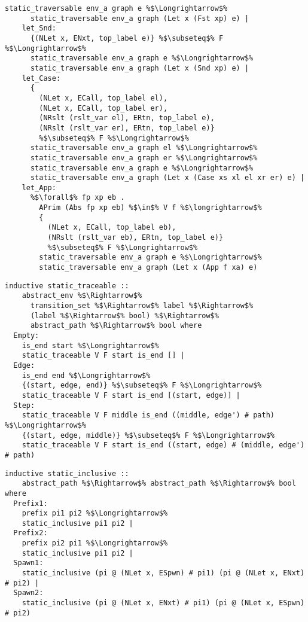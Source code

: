 \begin{lstlisting}[style=codestyle1, escapechar=\%]
      static_traversable env_a graph e %$\Longrightarrow$%
      static_traversable env_a graph (Let x (Fst xp) e) |
    let_Snd:
      {(NLet x, ENxt, top_label e)} %$\subseteq$% F %$\Longrightarrow$%
      static_traversable env_a graph e %$\Longrightarrow$%
      static_traversable env_a graph (Let x (Snd xp) e) |
    let_Case:
      {
        (NLet x, ECall, top_label el),
        (NLet x, ECall, top_label er),
        (NRslt (rslt_var el), ERtn, top_label e),
        (NRslt (rslt_var er), ERtn, top_label e)}
        %$\subseteq$% F %$\Longrightarrow$%
      static_traversable env_a graph el %$\Longrightarrow$%
      static_traversable env_a graph er %$\Longrightarrow$%
      static_traversable env_a graph e %$\Longrightarrow$%
      static_traversable env_a graph (Let x (Case xs xl el xr er) e) |
    let_App:
      %$\forall$% fp xp eb .
        APrim (Abs fp xp eb) %$\in$% V f %$\longrightarrow$%
        {
          (NLet x, ECall, top_label eb),
          (NRslt (rslt_var eb), ERtn, top_label e)}
          %$\subseteq$% F %$\Longrightarrow$%
        static_traversable env_a graph e %$\Longrightarrow$%
        static_traversable env_a graph (Let x (App f xa) e)

  \end{lstlisting}

\begin{lstlisting}[style=codestyle1, escapechar=\%]
  inductive static_traceable ::
    abstract_env %$\Rightarrow$%
      transition_set %$\Rightarrow$% label %$\Rightarrow$%
      (label %$\Rightarrow$% bool) %$\Rightarrow$%
      abstract_path %$\Rightarrow$% bool where
  Empty:
    is_end start %$\Longrightarrow$%
    static_traceable V F start is_end [] |
  Edge:
    is_end end %$\Longrightarrow$%
    {(start, edge, end)} %$\subseteq$% F %$\Longrightarrow$%
    static_traceable V F start is_end [(start, edge)] |
  Step:
    static_traceable V F middle is_end ((middle, edge') # path) %$\Longrightarrow$%
    {(start, edge, middle)} %$\subseteq$% F %$\Longrightarrow$%
    static_traceable V F start is_end ((start, edge) # (middle, edge') # path)
  \end{lstlisting}

\begin{lstlisting}[style=codestyle1, escapechar=\%]
  inductive static_inclusive ::
    abstract_path %$\Rightarrow$% abstract_path %$\Rightarrow$% bool where
  Prefix1:
    prefix pi1 pi2 %$\Longrightarrow$%
    static_inclusive pi1 pi2 |
  Prefix2:
    prefix pi2 pi1 %$\Longrightarrow$%
    static_inclusive pi1 pi2 |
  Spawn1:
    static_inclusive (pi @ (NLet x, ESpwn) # pi1) (pi @ (NLet x, ENxt) # pi2) |
  Spawn2:
    static_inclusive (pi @ (NLet x, ENxt) # pi1) (pi @ (NLet x, ESpwn) # pi2)
  \end{lstlisting}

